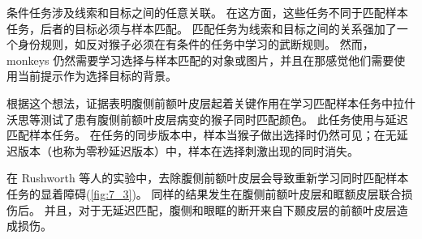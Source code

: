 条件任务涉及线索和目标之间的任意关联。 
在这方面，这些任务不同于匹配样本任务，后者的目标必须与样本匹配。
匹配任务为线索和目标之间的关系强加了一个身份规则，如反对猴子必须在有条件的任务中学习的武断规则。 
然而，monkeys 仍然需要学习选择与样本匹配的对象或图片，并且在那感觉他们需要使用当前提示作为选择目标的背景。
\par


根据这个想法，证据表明腹侧前额叶皮层起着关键作用在学习匹配样本任务中拉什沃思等\cite{rushworth1997ventral}测试了患有腹侧前额叶皮层病变的猴子同时匹配颜色。 
此任务使用与延迟匹配样本任务。 
在任务的同步版本中，样本当猴子做出选择时仍然可见；在无延迟版本（也称为零秒延迟版本）中，样本在选择刺激出现的同时消失。
\par


在 Rushworth 等人的实验中，去除腹侧前额叶皮层会导致重新学习同时匹配样本任务的显着障碍(\ref{fig:7_3})。
同样的结果发生在腹侧前额叶皮层和眶额皮层联合损伤后\cite{bussey2001role}。
并且，对于无延迟匹配，腹侧和眼眶的断开来自下颞皮层的前额叶皮层造成损伤\cite{bussey2002interaction}。
\par


